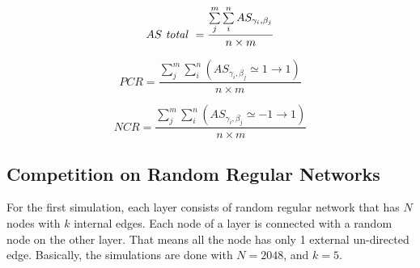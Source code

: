 \documentclass[english]{cccconf}
\begin{document}
\begin{equation}
AS\mbox{ \textit{total} } = \frac{{\sum\limits_j^m {\sum\limits_i^n {A{S_{{\gamma _i},{\beta _j}}}} } }}{{n \times m }}
\end{equation}

\begin{equation}
PCR = \frac{{\sum\limits_j^m {\sum\limits_i^n {(A{S_{{\gamma _i},{\beta _j}}} \simeq  1 \to 1)} } }}{{n \times m}}
\end{equation}

\begin{equation}
NCR = \frac{{\sum\limits_j^m {\sum\limits_i^n {(A{S_{{\gamma _i},{\beta _j}}} \simeq   - 1 \to 1)} } }}{{n \times m}}
\end{equation}

\subsection{Competition on Random Regular Networks}
For the first simulation, each layer consists of random regular network that has $N$ nodes with $k$ internal edges\cite{kimsangwoo2012, bela2001}. Each node of a layer is connected with a random node on the other layer. That means all the node has only 1 external un-directed edge. Basically, the simulations are done with $N=2048$, and $k=5$. 
\end{document}
